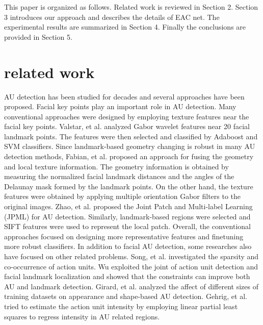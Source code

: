 \documentclass[a4paper, 10pt, conference]{ieeeconf}      %
\begin{document}
This paper is organized as follows. Related work is reviewed in Section 2. Section 3 introduces our approach and describes the details of EAC net. The experimental results are summarized in Section 4. Finally the conclusions are provided in Section 5.


\section{related work}

AU detection has been studied for decades and several approaches have been proposed. Facial key points play an important role in AU detection. Many conventional approaches \cite{p10, p11, p14,  p16, p17, p18, p24, p30} were designed by employing texture features near the facial key points. Valstar, et al. \cite{p9} analyzed Gabor wavelet features near 20 facial landmark points. The features were then selected and classified by Adaboost and SVM classifiers. Since landmark-based geometry changing is robust in many AU detection methods, Fabian, et al. \cite{p12} proposed an approach for fusing the geometry and local texture information. The geometry information is obtained by measuring the normalized facial landmark distances and the angles of the Delaunay mask formed by the landmark points. On the other hand, the texture features were obtained by applying multiple orientation Gabor filters to the original images. Zhao, et al. \cite{p13} proposed the Joint Patch and Multi-label Learning (JPML) for AU detection. Similarly, landmark-based regions were selected and SIFT features were used to represent the local patch. Overall, the conventional approaches focused on designing more representative features and finetuning more robust classifiers.
In addition to facial AU detection, some researches also have focused on other related problems. Song, et al. \cite{p23} investigated the sparsity and co-occurrence of action units. Wu \cite{p19} exploited the joint of action unit detection and facial landmark localization and showed that the constraints can improve both AU and landmark detection. Girard, et al. \cite{p20} analyzed the affect of different sizes of training datasets on appearance and shape-based AU detection. Gehrig, et al. \cite{p21} tried to estimate the action unit intensity by employing linear partial least squares to regress intensity in AU related regions.
\end{document}
